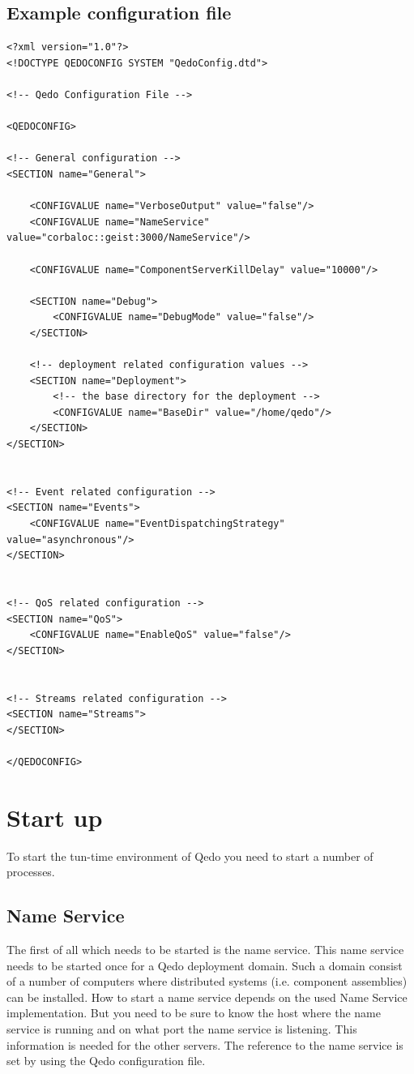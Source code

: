 \documentclass[12pt,a4paper]{report}
\begin{document}
\subsection{Example configuration file}
\label{example}
\begin{verbatim}
<?xml version="1.0"?>
<!DOCTYPE QEDOCONFIG SYSTEM "QedoConfig.dtd">

<!-- Qedo Configuration File -->

<QEDOCONFIG>

<!-- General configuration -->
<SECTION name="General">

	<CONFIGVALUE name="VerboseOutput" value="false"/>
	<CONFIGVALUE name="NameService" value="corbaloc::geist:3000/NameService"/>

	<CONFIGVALUE name="ComponentServerKillDelay" value="10000"/>

	<SECTION name="Debug">
		<CONFIGVALUE name="DebugMode" value="false"/>
	</SECTION>

	<!-- deployment related configuration values -->
	<SECTION name="Deployment">
		<!-- the base directory for the deployment -->
		<CONFIGVALUE name="BaseDir" value="/home/qedo"/>
	</SECTION>
</SECTION>

	
<!-- Event related configuration -->
<SECTION name="Events">
	<CONFIGVALUE name="EventDispatchingStrategy" value="asynchronous"/>
</SECTION>

	
<!-- QoS related configuration -->
<SECTION name="QoS">
	<CONFIGVALUE name="EnableQoS" value="false"/>
</SECTION>


<!-- Streams related configuration -->
<SECTION name="Streams">
</SECTION>

</QEDOCONFIG>

\end{verbatim}


\section{Start up}
\label{sec:StartUp}
To start the tun-time environment of Qedo you need to start a number of processes. 

\subsection{Name Service}
\label{sec:NameService}

The first of all which needs to be started is the name service. This name service needs to be started once for a Qedo deployment domain. Such a domain consist of a number of computers where distributed systems (i.e. component assemblies) can be installed. How to start a name service depends on the used Name Service implementation. But you need to be sure to know the host where the name service is running and on what port the name service is listening. This information is needed for the other servers. The reference to the name service is set by using the Qedo configuration file. 
\end{document}
